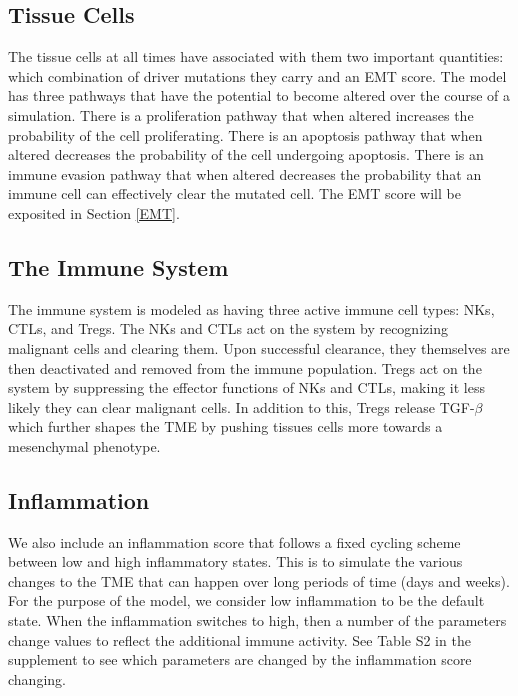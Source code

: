 \documentclass[11pt]{article}
\begin{document}
\subsection{Tissue Cells}\label{TissueCells}
The tissue cells at all times have associated with them two important quantities: which combination of driver mutations they carry and an EMT score.
The model has three pathways that have the potential to become altered over the course of a simulation.
There is a proliferation pathway that when altered increases the probability of the cell proliferating.
There is an apoptosis pathway that when altered decreases the probability of the cell undergoing apoptosis.
There is an immune evasion pathway that when altered decreases the probability that an immune cell can effectively clear the mutated cell.
The EMT score will be exposited in Section \ref{EMT}. 

\subsection{The Immune System}\label{ImmuneSystem}
The immune system is modeled as having three active immune cell types: NKs, CTLs, and Tregs.
The NKs and CTLs act on the system by recognizing malignant cells and clearing them.
Upon successful clearance, they themselves are then deactivated and removed from the immune population.
Tregs act on the system by suppressing the effector functions of NKs and CTLs, making it less likely they can clear malignant cells.
In addition to this, Tregs release TGF-$\beta$ which further shapes the TME by pushing tissues cells more towards a mesenchymal phenotype.

\subsection{Inflammation} %
We also include an inflammation score that follows a fixed cycling scheme between low and high inflammatory states.
This is to simulate the various changes to the TME that can happen over long periods of time (days and weeks).
For the purpose of the model, we consider low inflammation to be the default state.
When the inflammation switches to high, then a number of the parameters change values to reflect the additional immune activity.
See Table S2 in the supplement to see which parameters are changed by the inflammation score changing.
\end{document}
